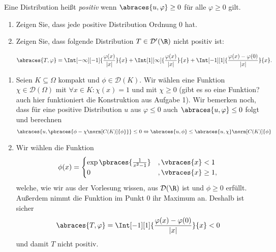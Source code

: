 
\begin{exercise}

Eine Distribution heißt \textit{positiv} wenn $\abraces{u, \varphi} \geq 0$ für alle $\varphi \geq 0$ gilt.

\begin{enumerate}[label = (\roman*)]
    \item Zeigen Sie, dass jede positive Distribution Ordnung $0$ hat.
    \item Zeigen Sie, dass folgende Distribution $T \in \mathcal{D}^\prime(\R)$ nicht positiv ist:
    
    \begin{align*}
        \abraces{T, \varphi}
        =
        \Int[-\infty][-1]
        {
            \frac{\varphi(x)}{|x|}
        }{x}
        +
        \Int[1][\infty]
        {
            \frac{\varphi(x)}{|x|}
        }{x}
        +
        \Int[-1][1]
        {
            \frac{\varphi(x) - \varphi(0)}{|x|}
        }{x}.
    \end{align*}

\end{enumerate}

\end{exercise}


\begin{solution}
\phantom{}
\begin{enumerate}[label = (\roman*)]
	\item Seien $K \subseteq \Omega$ kompakt und $\phi \in \mathcal{D}(K)$. Wir wählen eine Funktion $\chi \in \mathcal{D}(\Omega)$ mit $\forall x \in K: \chi(x) = 1$ und mit $\chi \geq 0$ (gibt es so eine Funktion? auch hier funktioniert die Konstruktion aus Aufgabe 1). Wir bemerken noch, dass für eine positive Distribution $u$ aus $\varphi \leq 0$ auch $\abraces{u,\varphi} \leq 0$ folgt und berechnen
	\begin{align*}
	\abraces{u, \pbraces{\phi - \chi\norm[C(K)]{\phi}}} \leq 0 \Leftrightarrow \abraces{u, \phi} \leq \abraces{u, \chi} \norm[C(K)]{\phi}
	\end{align*}
	\item Wir wählen die Funktion 
	\begin{align*}
	\phi(x) =
	\begin{cases}
	\exp\pbraces{\frac{1}{x^2 - 1}} &, \vbraces{x} < 1 \\
	0 &, \vbraces{x} \geq 1,
	\end{cases}
	\end{align*}
	welche, wie wir aus der Vorlesung wissen, aus $\mathcal{D}(\R)$ ist und $\phi \geq 0$ erfüllt. Außerdem nimmt die Funktion im Punkt $0$ ihr Maximum an. Deshalb ist sicher
	\begin{align*}
	\abraces{T, \varphi} = \Int[-1][1]
	{
		\frac{\varphi(x) - \varphi(0)}{|x|}
	}{x} < 0 
	\end{align*}
	und damit $T$ nicht positiv.
\end{enumerate}

\end{solution}

